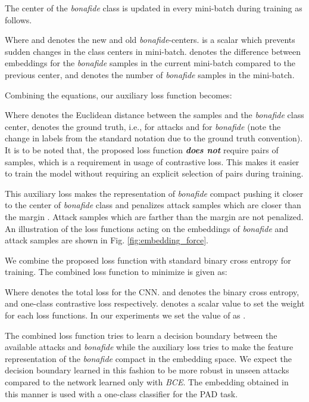 \documentclass[journal]{IEEEtran}
\begin{document}
The center of the \textit{bonafide} class is updated in every mini-batch during training as follows.


Where  and  denotes the new and old \textit{bonafide}-centers.  is a scalar which prevents sudden changes in the class centers in mini-batch.   denotes the difference between embeddings for the \textit{bonafide} samples in the current mini-batch compared to the previous center, and  denotes the number of \textit{bonafide} samples in the mini-batch.

Combining the equations, our auxiliary loss function becomes:


Where  denotes the Euclidean distance between the samples and the \textit{bonafide} class center,  denotes the ground truth, i.e.,  for attacks and  for \textit{bonafide} (note the change in labels from the standard notation due to the ground truth convention). It is to be noted that, the proposed loss function \textit{\textbf{does not}} require pairs of samples, which is a requirement in usage of contrastive loss. This makes it easier to train the model without requiring an explicit selection of pairs during training.

This auxiliary loss makes the representation of \textit{bonafide} compact pushing it closer to the center of \textit{bonafide} class and penalizes attack samples which are closer than the margin . Attack samples which are farther than the margin  are not penalized. An illustration of the loss functions acting on the embeddings of \textit{bonafide} and attack samples are shown in Fig. \ref{fig:embedding_force}.

We combine the proposed loss function with standard binary cross entropy for training. The combined loss function to minimize is given as:


 Where  denotes the total loss for the CNN.  and  denotes the binary cross entropy, and one-class contrastive loss  respectively.   denotes a scalar value to set the weight for each loss functions. In our experiments we set the value of  as .

The combined loss function  tries to learn a decision boundary between the available attacks and \textit{bonafide} while the auxiliary loss tries to make the feature representation of the \textit{bonafide} compact in the embedding space. We expect the decision boundary learned in this fashion to be more robust in unseen attacks compared to the network learned only with \textit{BCE}. The embedding obtained in this manner is used with a one-class classifier for the PAD task.
\end{document}
